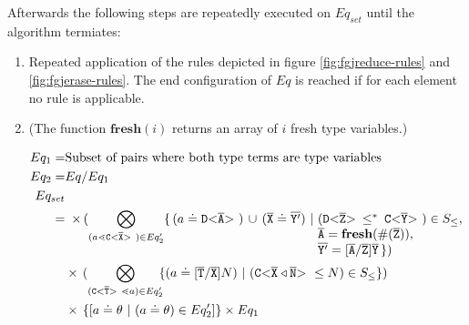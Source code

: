 \documentclass[runningheads]{llncs}
\begin{document}
Afterwards the following steps are repeatedly executed on $Eq_{set}$ until the algorithm termiates:

\begin{enumerate}
\item Repeated application of the rules depicted in figure \ref{fig:fgjreduce-rules} and \ref{fig:fgjerase-rules}.
The end configuration of $Eq$ is reached if for each element
no rule is applicable.

\item
(The function $\textbf{fresh}(i)$ returns an array of $i$ fresh type variables.)

\begin{align*}
Eq_1 =& \text{Subset of pairs where both type terms are type variables}\\
Eq_2 =& Eq / Eq_1 \\
Eq_{set}\\ 
    = 
     & \begin{array}[t]{l@{\,}ll}
      \times \, (\displaystyle{\bigotimes_{(a \lessdot \exptype{C}{\ol{X}}) \in Eq'_2}}
      \{\,(a \doteq \exptype{D}{\ol{A}}) \, \cup \, (\ol{X} \doteq \ol{Y'}) \ | \ \sarray{@{}l}{
        (\exptype{D}{\ol{Z}} \olsub \exptype{C}{\ol{Y}}) \in S_\leq, \\
        \ol{A} = \textbf{fresh}(\#(\ol{Z})), \\
        \ol{Y'} = [\ol{A}/\ol{Z}]\ol{Y}
        \,\})}\\ 
      \end{array}\\
    & \times\, 
      (\displaystyle{\bigotimes_{(\exptype{C}{\overline{T}} \lessdot a) \in Eq'_2}}\!\!
      \set{(a \doteq [\ol{T}/\ol{X}]N ) \ | \ (\exptype{C}{\overline{X} \triangleleft \ol{N}} \leq N) \in
        S_\leq})\\
    & \times\, \set{[a \doteq \theta \ | \  (a \doteq \theta) \in Eq'_2]} \times Eq_1 \\
\end{align*}


\end{enumerate}
\end{document}
